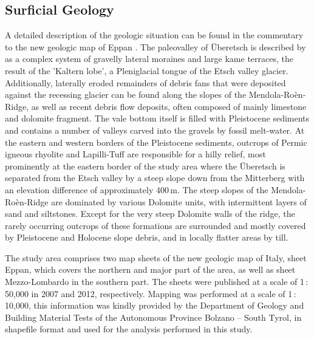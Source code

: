 \documentclass[preprint,12pt,authoryear]{elsarticle}
\begin{document}
\subsection{Surficial Geology}
A detailed  description of the geologic situation can be found in the commentary to the new geologic map of Eppan \citep{Avanzini2006}. 
The paleovalley of {\"U}beretsch is described by \cite{Scholz2005} as a complex system of gravelly lateral moraines and large kame terraces, the result of the 'Kaltern lobe', a Pleniglacial tongue of the Etsch valley glacier. Additionally, laterally eroded remainders of debris fans that were deposited against the recessing glacier can be found along the slopes of the Mendola-Ro\`en-Ridge, as well as recent debris flow deposits, often composed of mainly limestone and dolomite fragment. The vale bottom itself is filled with Pleistocene sediments and contains a  number of valleys carved into the gravels by fossil melt-water. At the eastern and western borders of the Pleistocene sediments, outcrops of Permic igneous rhyolite and Lapilli-Tuff are responsible for a hilly relief, most prominently at the eastern border of the study area where the {\"U}beretsch is separated from the Etsch valley by a steep slope down from the Mitterberg with an elevation difference of approximately 400\,m.   
The steep slopes of the Mendola-Ro\`en-Ridge are dominated by various Dolomite units, with intermittent layers of sand and siltstones. Except for the very steep Dolomite walls of the ridge, the rarely occurring outcrops of these formations are surrounded and mostly covered by Pleistocene and Holocene slope debris, and in locally flatter areas by till. 
 
The study area comprises two map sheets of the new geologic map of Italy, sheet Eppan,  which covers the northern and major part of the area, as well as sheet Mezzo-Lombardo in the southern part. The sheets were published at a scale of 1\,:\,50,000 in 2007 and 2012, respectively. Mapping was performed at a scale of 1\,:\,10,000, this information was kindly provided by the Department of Geology and Building Material Tests of the Autonomous Province Bolzano -- South Tyrol, in shapefile format and used for the analysis performed in this study.
 
\end{document}

